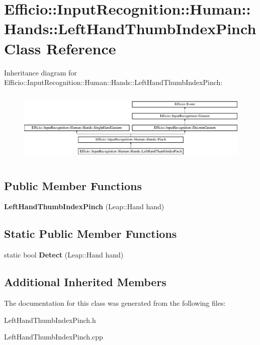 \hypertarget{class_efficio_1_1_input_recognition_1_1_human_1_1_hands_1_1_left_hand_thumb_index_pinch}{}\section{Efficio\+:\+:Input\+Recognition\+:\+:Human\+:\+:Hands\+:\+:Left\+Hand\+Thumb\+Index\+Pinch Class Reference}
\label{class_efficio_1_1_input_recognition_1_1_human_1_1_hands_1_1_left_hand_thumb_index_pinch}
Inheritance diagram for Efficio\+:\+:Input\+Recognition\+:\+:Human\+:\+:Hands\+:\+:Left\+Hand\+Thumb\+Index\+Pinch\+:\begin{figure}[H]
\begin{center}
\leavevmode
\includegraphics[height=3.517588cm]{class_efficio_1_1_input_recognition_1_1_human_1_1_hands_1_1_left_hand_thumb_index_pinch}
\end{center}
\end{figure}
\subsection*{Public Member Functions}
\begin{DoxyCompactItemize}
\item 
{\bfseries Left\+Hand\+Thumb\+Index\+Pinch} (Leap\+::\+Hand hand)\hypertarget{class_efficio_1_1_input_recognition_1_1_human_1_1_hands_1_1_left_hand_thumb_index_pinch_ab7d6a1e0784642b268c48d778d6a8736}{}\label{class_efficio_1_1_input_recognition_1_1_human_1_1_hands_1_1_left_hand_thumb_index_pinch_ab7d6a1e0784642b268c48d778d6a8736}

\end{DoxyCompactItemize}
\subsection*{Static Public Member Functions}
\begin{DoxyCompactItemize}
\item 
static bool {\bfseries Detect} (Leap\+::\+Hand hand)\hypertarget{class_efficio_1_1_input_recognition_1_1_human_1_1_hands_1_1_left_hand_thumb_index_pinch_a939932138821b249e2ec44b0dd476483}{}\label{class_efficio_1_1_input_recognition_1_1_human_1_1_hands_1_1_left_hand_thumb_index_pinch_a939932138821b249e2ec44b0dd476483}

\end{DoxyCompactItemize}
\subsection*{Additional Inherited Members}


The documentation for this class was generated from the following files\+:\begin{DoxyCompactItemize}
\item 
Left\+Hand\+Thumb\+Index\+Pinch.\+h\item 
Left\+Hand\+Thumb\+Index\+Pinch.\+cpp\end{DoxyCompactItemize}
